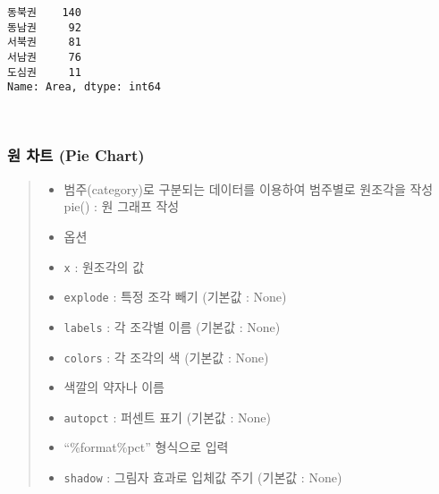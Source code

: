 \documentclass[11pt]{article}
\providecommand{\tightlist}{%
      \setlength{\itemsep}{0pt}\setlength{\parskip}{0pt}}
\begin{document}
    \begin{Verbatim}[commandchars=\\\{\}]
동북권    140
동남권     92
서북권     81
서남권     76
도심권     11
Name: Area, dtype: int64

    \end{Verbatim}

    \begin{center}
    \end{center}
    { \hspace*{\fill} \\}
    
    \hypertarget{uxc6d0-uxcc28uxd2b8-pie-chart}{%
\subsubsection{원 차트 (Pie
Chart)}\label{uxc6d0-uxcc28uxd2b8-pie-chart}}

\begin{quote}
\begin{itemize}
\tightlist
\item
  범주(category)로 구분되는 데이터를 이용하여 범주별로 원조각을 작성
  pie() : 원 그래프 작성
\item
  옵션
\item
  \texttt{x} : 원조각의 값
\item
  \texttt{explode} : 특정 조각 빼기 (기본값 : None)
\item
  \texttt{labels} : 각 조각별 이름 (기본값 : None)
\item
  \texttt{colors} : 각 조각의 색 (기본값 : None)
\item
  색깔의 약자나 이름
\item
  \texttt{autopct} : 퍼센트 표기 (기본값 : None)
\item
  ``\%format\%pct'' 형식으로 입력
\item
  \texttt{shadow} : 그림자 효과로 입체값 주기 (기본값 : None)
\end{itemize}
\end{quote}
\end{document}
